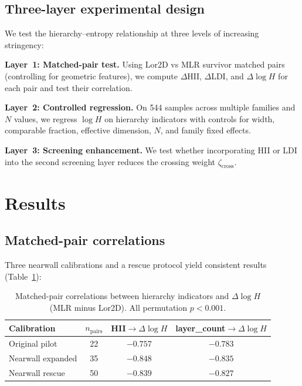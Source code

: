 \documentclass[12pt,a4paper]{article}
\begin{document}
\subsection{Three-layer experimental design}

We test the hierarchy--entropy relationship at three levels of increasing
stringency:

\textbf{Layer~1: Matched-pair test.}
Using Lor2D vs MLR survivor matched pairs (controlling for geometric features),
we compute $\Delta\text{HII}$, $\Delta\text{LDI}$, and $\Delta\log H$ for each
pair and test their correlation.

\textbf{Layer~2: Controlled regression.}
On 544 samples across multiple families and $N$ values, we regress $\log H$ on
hierarchy indicators with controls for width, comparable fraction, effective
dimension, $N$, and family fixed effects.

\textbf{Layer~3: Screening enhancement.}
We test whether incorporating HII or LDI into the second screening layer reduces
the crossing weight $\zeta_{\mathrm{cross}}$.

\section{Results}

\subsection{Matched-pair correlations}

Three nearwall calibrations and a rescue protocol yield consistent results
(Table~\ref{tab:c_pairs}):

\begin{table}[h]
\centering
\caption{Matched-pair correlations between hierarchy indicators and
$\Delta\log H$ (MLR minus Lor2D). All permutation $p<0.001$.}
\label{tab:c_pairs}
\begin{tabular}{lccc}
\toprule
Calibration & $n_{\mathrm{pairs}}$ & HII$\to\Delta\log H$ & layer\_count$\to\Delta\log H$ \\
\midrule
Original pilot     & 22 & $-0.757$ & $-0.783$ \\
Nearwall expanded  & 35 & $-0.848$ & $-0.835$ \\
Nearwall rescue    & 50 & $-0.839$ & $-0.827$ \\
\bottomrule
\end{tabular}
\end{table}
\end{document}
